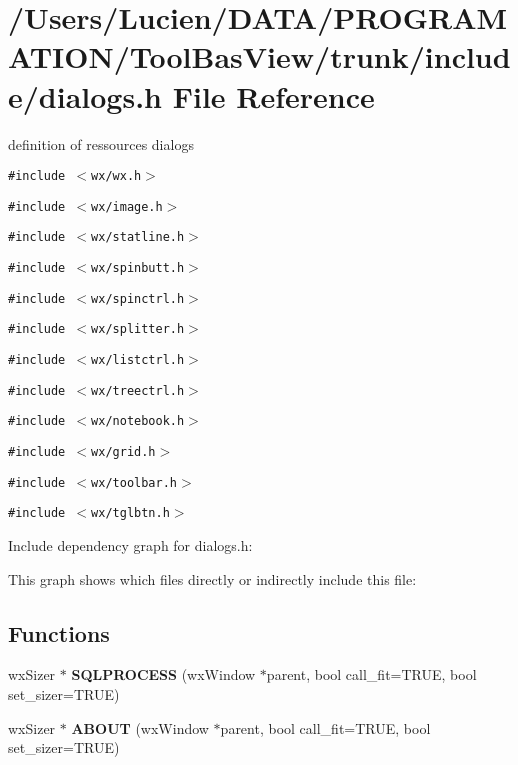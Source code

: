 \section{/Users/Lucien/DATA/PROGRAMATION/Tool\-Bas\-View/trunk/include/dialogs.h File Reference}
\label{dialogs_8h}
definition of ressources dialogs 

{\tt \#include $<$wx/wx.h$>$}\par
{\tt \#include $<$wx/image.h$>$}\par
{\tt \#include $<$wx/statline.h$>$}\par
{\tt \#include $<$wx/spinbutt.h$>$}\par
{\tt \#include $<$wx/spinctrl.h$>$}\par
{\tt \#include $<$wx/splitter.h$>$}\par
{\tt \#include $<$wx/listctrl.h$>$}\par
{\tt \#include $<$wx/treectrl.h$>$}\par
{\tt \#include $<$wx/notebook.h$>$}\par
{\tt \#include $<$wx/grid.h$>$}\par
{\tt \#include $<$wx/toolbar.h$>$}\par
{\tt \#include $<$wx/tglbtn.h$>$}\par


Include dependency graph for dialogs.h:

This graph shows which files directly or indirectly include this file:\subsection*{Functions}
\begin{CompactItemize}
\item 
wx\-Sizer $\ast$ {\bf SQLPROCESS} (wx\-Window $\ast$parent, bool call\_\-fit=TRUE, bool set\_\-sizer=TRUE)\label{dialogs_8h_144c441be7b2a609fab22048b49d5220}

\item 
wx\-Sizer $\ast$ {\bf ABOUT} (wx\-Window $\ast$parent, bool call\_\-fit=TRUE, bool set\_\-sizer=TRUE)\label{dialogs_8h_a877e813201cf51bc29da31f1b258440}

\end{CompactItemize}
